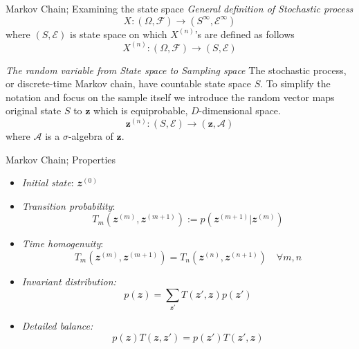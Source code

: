 \documentclass{bredelebeamer}
\begin{document}
\begin{frame}{Markov Chain; Examining the state space}
  \textit{General definition of Stochastic process}
  \begin{equation}
    X : (\Omega, \mathcal{F}) \rightarrow (S^{\infty},\mathcal{E}^{\infty})
  \end{equation}
  where $(S, \mathcal{E})$ is state space on which $X^{(n)}$'s are defined as
  follows
  \begin{equation}
    X^{(n)} :  (\Omega, \mathcal{F}) \rightarrow (S, \mathcal{E})
  \end{equation}

  \textit{The random variable from State space to Sampling space}
  The stochastic process, or discrete-time Markov chain, have countable
  state space $S$. To simplify the notation and focus on the sample itself
  we introduce the random vector maps original state $S$ to $\mathbf{z}$ which
  is equiprobable, $D$-dimensional space.
  \begin{equation}
    \mathbf{z}^{(n)}: (S, \mathcal{E}) \rightarrow (\mathbf{z}, \mathcal{A})
  \end{equation}
  where $\mathcal{A}$ is a $\sigma$-algebra of $\mathbf{z}$.
\end{frame}


\begin{frame}{Markov Chain; Properties}
  \begin{itemize}
    \item \textit{Initial state}: $\mathbfit{z}^{(0)}$
    \item \textit{Transition probability}:
    \begin{equation}
      T_m(\mathbfit{z}^{(m)},\mathbfit{z}^{(m+1)})
      := p(\mathbfit{z}^{(m+1)}|\mathbfit{z}^{(m)})
    \end{equation}
    \item \textit{Time homogenuity}:
    \begin{equation}
      T_m(\mathbfit{z}^{(m)},\mathbfit{z}^{(m+1)})
      = T_n(\mathbfit{z}^{(n)},\mathbfit{z}^{(n+1)})
      \quad \forall m, n
    \end{equation}
    \item \textit{Invariant distribution:}
    \begin{equation}
      p(\mathbfit{z}) = \sum_{\mathbfit{z}'} T(\mathbfit{z}',\mathbfit{z}) p(\mathbfit{z}')
    \end{equation}
    \item \textit{Detailed balance:}
    \begin{equation}
      p(\mathbfit{z}) T(\mathbfit{z},\mathbfit{z}')
      = p(\mathbfit{z}') T(\mathbfit{z}',\mathbfit{z})
    \end{equation}
  \end{itemize}
\end{frame}
\end{document}
